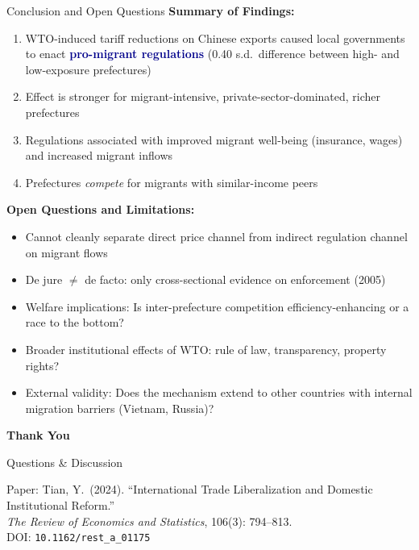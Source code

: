 \documentclass[10pt,aspectratio=169,t]{beamer}
\newcommand{\hlight}[1]{\textcolor{darkblue}{\textbf{#1}}}
\begin{document}
\begin{frame}{Conclusion and Open Questions}
\textbf{Summary of Findings:}
\begin{enumerate}\setlength{\itemsep}{3pt}
    \item WTO-induced tariff reductions on Chinese exports caused local governments to enact \hlight{pro-migrant regulations} (0.40 s.d.\ difference between high- and low-exposure prefectures)
    \item Effect is stronger for migrant-intensive, private-sector-dominated, richer prefectures
    \item Regulations associated with improved migrant well-being (insurance, wages) and increased migrant inflows
    \item Prefectures \textit{compete} for migrants with similar-income peers
\end{enumerate}

\bigskip
\textbf{Open Questions and Limitations:}
\begin{itemize}\setlength{\itemsep}{3pt}
    \item Cannot cleanly separate direct price channel from indirect regulation channel on migrant flows
    \item De jure $\neq$ de facto: only cross-sectional evidence on enforcement (2005)
    \item Welfare implications: Is inter-prefecture competition efficiency-enhancing or a race to the bottom?
    \item Broader institutional effects of WTO: rule of law, transparency, property rights?
    \item External validity: Does the mechanism extend to other countries with internal migration barriers (Vietnam, Russia)?
\end{itemize}
\end{frame}

\begin{frame}[plain]
\begin{center}
\vspace{2cm}
{\LARGE\bfseries Thank You}

\bigskip
{\large Questions \& Discussion}

\bigskip\bigskip
\footnotesize
Paper: Tian, Y.\ (2024). ``International Trade Liberalization and Domestic Institutional Reform.''\\
\textit{The Review of Economics and Statistics}, 106(3): 794--813.\\[4pt]
DOI: \texttt{10.1162/rest\_a\_01175}
\end{center}
\end{frame}
\end{document}
